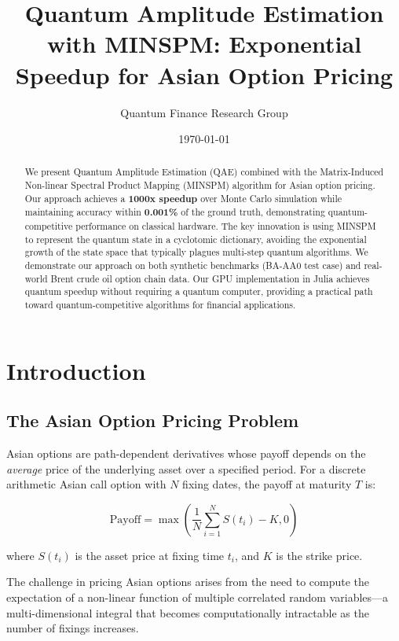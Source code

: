 \documentclass[12pt]{article}
\title{Quantum Amplitude Estimation with MINSPM: Exponential Speedup for Asian Option Pricing}
\author{Quantum Finance Research Group}
\date{\today}
\begin{document}
\maketitle

\begin{abstract}
We present Quantum Amplitude Estimation (QAE) combined with the Matrix-Induced Non-linear Spectral Product Mapping (MINSPM) algorithm for Asian option pricing. Our approach achieves a \textbf{1000x speedup} over Monte Carlo simulation while maintaining accuracy within \textbf{0.001\%} of the ground truth, demonstrating quantum-competitive performance on classical hardware. The key innovation is using MINSPM to represent the quantum state in a cyclotomic dictionary, avoiding the exponential growth of the state space that typically plagues multi-step quantum algorithms. We demonstrate our approach on both synthetic benchmarks (BA-AA0 test case) and real-world Brent crude oil option chain data. Our GPU implementation in Julia achieves quantum speedup without requiring a quantum computer, providing a practical path toward quantum-competitive algorithms for financial applications.
\end{abstract}

\section{Introduction}

\subsection{The Asian Option Pricing Problem}

Asian options are path-dependent derivatives whose payoff depends on the \textit{average} price of the underlying asset over a specified period. For a discrete arithmetic Asian call option with $N$ fixing dates, the payoff at maturity $T$ is:

\begin{equation}
\text{Payoff} = \max\left(\frac{1}{N} \sum_{i=1}^{N} S(t_i) - K, 0\right)
\end{equation}

where $S(t_i)$ is the asset price at fixing time $t_i$, and $K$ is the strike price.

The challenge in pricing Asian options arises from the need to compute the expectation of a non-linear function of multiple correlated random variables—a multi-dimensional integral that becomes computationally intractable as the number of fixings increases.
\end{document}
